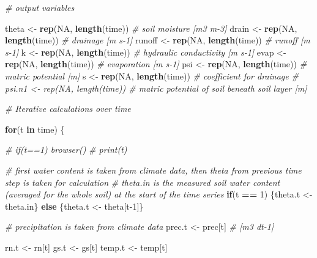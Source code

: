 \documentclass[
]{article}
\newenvironment{Shaded}{\begin{snugshade}}{\end{snugshade}}
\newcommand{\CommentTok}[1]{\textcolor[rgb]{0.56,0.35,0.01}{\textit{#1}}}
\newcommand{\ControlFlowTok}[1]{\textcolor[rgb]{0.13,0.29,0.53}{\textbf{#1}}}
\newcommand{\DecValTok}[1]{\textcolor[rgb]{0.00,0.00,0.81}{#1}}
\newcommand{\KeywordTok}[1]{\textcolor[rgb]{0.13,0.29,0.53}{\textbf{#1}}}
\newcommand{\NormalTok}[1]{#1}
\newcommand{\OperatorTok}[1]{\textcolor[rgb]{0.81,0.36,0.00}{\textbf{#1}}}
\newcommand{\OtherTok}[1]{\textcolor[rgb]{0.56,0.35,0.01}{#1}}
\newcommand{\StringTok}[1]{\textcolor[rgb]{0.31,0.60,0.02}{#1}}
\begin{document}
\begin{Shaded}
\begin{Highlighting}[]
{{{{  \CommentTok{# output variables}

\NormalTok{  theta <-}\StringTok{ }\KeywordTok{rep}\NormalTok{(}\OtherTok{NA}\NormalTok{, }\KeywordTok{length}\NormalTok{(time))    }\CommentTok{# soil moisture [m3 m-3]}
\NormalTok{  drain <-}\StringTok{ }\KeywordTok{rep}\NormalTok{(}\OtherTok{NA}\NormalTok{, }\KeywordTok{length}\NormalTok{(time))    }\CommentTok{# drainage [m s-1]}
\NormalTok{  runoff <-}\StringTok{ }\KeywordTok{rep}\NormalTok{(}\OtherTok{NA}\NormalTok{, }\KeywordTok{length}\NormalTok{(time))   }\CommentTok{# runoff [m s-1]}
\NormalTok{  k <-}\StringTok{ }\KeywordTok{rep}\NormalTok{(}\OtherTok{NA}\NormalTok{, }\KeywordTok{length}\NormalTok{(time))        }\CommentTok{# hydraulic conductivity [m s-1]}
\NormalTok{  evap <-}\StringTok{ }\KeywordTok{rep}\NormalTok{(}\OtherTok{NA}\NormalTok{, }\KeywordTok{length}\NormalTok{(time))     }\CommentTok{# evaporation [m s-1]}
\NormalTok{  psi <-}\StringTok{ }\KeywordTok{rep}\NormalTok{(}\OtherTok{NA}\NormalTok{, }\KeywordTok{length}\NormalTok{(time))      }\CommentTok{# matric potential [m]}
\NormalTok{  s <-}\StringTok{ }\KeywordTok{rep}\NormalTok{(}\OtherTok{NA}\NormalTok{, }\KeywordTok{length}\NormalTok{(time))        }\CommentTok{# coefficient for drainage}
  \CommentTok{# psi.n1 <- rep(NA, length(time))   # matric potential of soil beneath soil layer [m]}


  \CommentTok{# Iterative calculations over time}

  \ControlFlowTok{for}\NormalTok{(t }\ControlFlowTok{in}\NormalTok{ time) \{}
    
    \CommentTok{# if(t==1) browser()}
    \CommentTok{# print(t)}

    \CommentTok{# first water content is taken from climate data, then theta from previous time step is taken for calculation}
    \CommentTok{# theta.in is the measured soil water content (averaged for the whole soil) at the start of the time series}
    \ControlFlowTok{if}\NormalTok{(t }\OperatorTok{==}\StringTok{ }\DecValTok{1}\NormalTok{) \{theta.t <-}\StringTok{ }\NormalTok{theta.in\} }\ControlFlowTok{else}\NormalTok{ \{theta.t <-}\StringTok{ }\NormalTok{theta[t}\DecValTok{-1}\NormalTok{]\}}

    \CommentTok{# precipitation is taken from climate data}
\NormalTok{    prec.t <-}\StringTok{ }\NormalTok{prec[t]  }\CommentTok{# [m3 dt-1]}
    
\NormalTok{    rn.t <-}\StringTok{ }\NormalTok{rn[t]}
\NormalTok{    gs.t <-}\StringTok{ }\NormalTok{gs[t]}
\NormalTok{    temp.t <-}\StringTok{ }\NormalTok{temp[t]}

}}}}
\end{Highlighting}
\end{Shaded}
\end{document}
